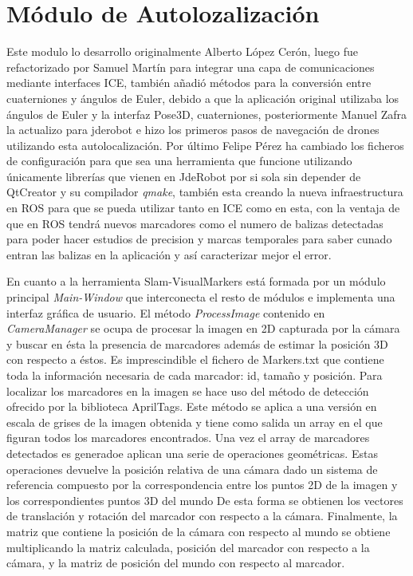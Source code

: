 \section{Módulo de Autolozalización} 
\hspace{1cm} Este modulo lo desarrollo originalmente Alberto López Cerón, luego fue refactorizado por Samuel Martín para integrar una capa de comunicaciones mediante interfaces ICE, también añadió métodos para la conversión entre cuaterniones y ángulos de Euler, debido a que la aplicación original utilizaba los ángulos de Euler y la interfaz Pose3D, cuaterniones, posteriormente Manuel Zafra la actualizo para jderobot e hizo los primeros pasos de navegación de drones utilizando esta autolocalización. Por último Felipe Pérez ha cambiado los ficheros de configuración para que sea una herramienta que funcione utilizando únicamente librerías que vienen en JdeRobot por si sola sin depender de QtCreator y su compilador \textit{qmake}, también esta creando la nueva infraestructura en ROS para que se pueda utilizar tanto en ICE como en esta, con la ventaja de que en ROS tendrá nuevos marcadores como el numero de balizas detectadas para poder hacer estudios de precision y marcas temporales para saber cunado entran las balizas en la aplicación y así caracterizar mejor el error. 

\hspace{1cm} En cuanto a la herramienta Slam-VisualMarkers  está formada por un módulo principal \textit{Main-Window} que interconecta el resto de módulos e implementa una interfaz gráfica de usuario. El método \textit{ProcessImage} contenido en \textit{CameraManager} se ocupa de procesar la imagen en 2D capturada por la cámara y buscar en ésta la presencia de marcadores además de estimar la posición 3D con respecto a éstos. Es imprescindible el fichero de Markers.txt que contiene toda la información necesaria de cada marcador: id, tamaño y posición. Para localizar los marcadores en la imagen se hace uso del método de detección ofrecido por la biblioteca AprilTags. Este método se aplica a una versión en escala de grises de la imagen obtenida y tiene como salida un array en el que figuran todos los marcadores encontrados. Una vez el array de marcadores detectados es generadoe aplican una serie de operaciones geométricas. Estas operaciones devuelve la posición relativa de una cámara dado un sistema de referencia compuesto por la correspondencia entre los puntos 2D de la imagen y los correspondientes puntos 3D del mundo De esta forma se obtienen los vectores de translación y rotación del marcador con respecto a la cámara. Finalmente, la matriz que contiene la posición de la cámara con respecto al mundo se obtiene multiplicando la matriz calculada, posición del marcador con respecto a la cámara, y la matriz de posición del mundo con respecto al marcador. 

